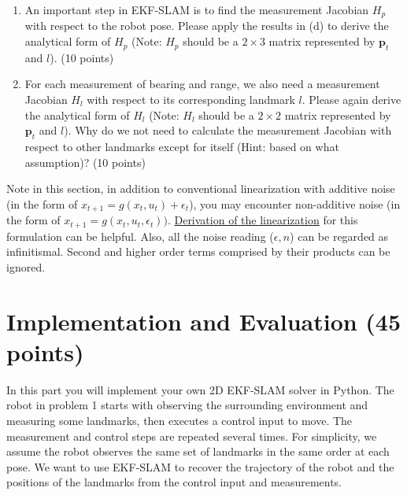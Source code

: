 \documentclass[12pt, a4paper]{article}
\begin{document}
\begin{enumerate}
\item An important step in EKF-SLAM is to find the measurement Jacobian
$H_{p}$ with respect to the robot pose. Please apply the results
in (d) to derive the analytical form of $H_{p}$ (Note: $H_{p}$ should
be a $2\times3$ matrix represented by $\mathbf{p}_{t}$ and $l$).
(10 points)

\item For each measurement of bearing and range, we also need a measurement
Jacobian $H_{l}$ with respect to its corresponding landmark $l$.
Please again derive the analytical form of $H_{l}$ (Note: $H_{l}$
should be a $2\times2$ matrix represented by $\mathbf{p}_{t}$ and
$l$). Why do we not need to calculate the measurement Jacobian with
respect to other landmarks except for itself (Hint: based on what
assumption)? (10 points)
\end{enumerate}

Note in this section, in addition to conventional linearization with additive noise (in the form of $x_{t+1} = g(x_t, u_t) + \epsilon_t$), you may encounter non-additive noise (in the form of $x_{t+1} = g(x_t, u_t, \epsilon_t))$. \href{https://en.wikipedia.org/wiki/Extended_Kalman_filter#Non-additive_noise_formulation_and_equations}{Derivation of the linearization} for this formulation can be helpful.
Also, all the noise reading ($\epsilon, n$) can be regarded as infinitismal. Second and higher order terms comprised by their products can be ignored.

\section{Implementation and Evaluation (45 points)}

In this part you will implement your own 2D EKF-SLAM solver in Python.
The robot in problem 1 starts with observing the surrounding environment
and measuring some landmarks, then executes a control input to move.
The measurement and control steps are repeated several times. For
simplicity, we assume the robot observes the same set of landmarks
in the same order at each pose. We want to use EKF-SLAM to recover
the trajectory of the robot and the positions of the landmarks from
the control input and measurements. 
\end{document}
